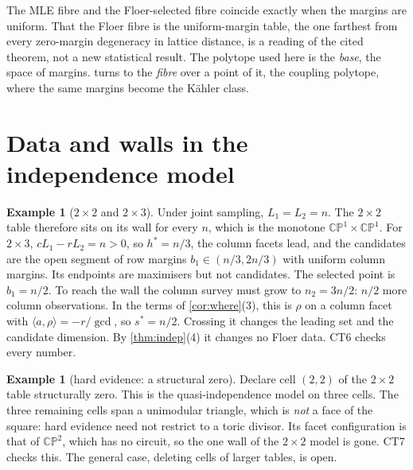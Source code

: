\documentclass[11pt]{article}
\theoremstyle{definition}\newtheorem{definition}[theorem]{Definition}\newtheorem{remark}[theorem]{Remark}\newtheorem{example}[theorem]{Example}\newtheorem{problem}[theorem]{Open problem}\crefname{problem}{Problem}{Problems}
\begin{document}
The MLE fibre and the Floer-selected fibre coincide exactly when the margins are uniform. That the Floer fibre is the uniform-margin table,
the one farthest from every zero-margin degeneracy in lattice distance, is a reading of the cited theorem, not a new statistical result.
The polytope used here is the \emph{base}, the space of margins.  turns to the \emph{fibre} over a point of it, the coupling polytope, where the
same margins become the K\"ahler class.

\section{Data and walls in the independence model}\label{sec:indepdata}
\begin{example}[$2\times2$ and $2\times3$]\label{ex:2x3}
Under joint sampling, $L_1=L_2=n$. The $2\times2$ table therefore sits on its wall for every $n$, which is the monotone $\mathbb{CP}^1\times\mathbb{CP}^1$. For $2\times3$, $cL_1-rL_2=n>0$, so $h^*=n/3$, the column
facets lead, and the candidates are the open segment of row margins $b_1\in(n/3,2n/3)$ with uniform column margins. Its endpoints are maximisers but not candidates.
The selected point is $b_1=n/2$. To reach the wall the column survey must grow to $n_2=3n/2$: $n/2$ more column observations. In the terms of \cref{cor:where}(3), this is
$\rho$ on a column facet with $\langle a,\rho\rangle=-r/\gcd$, so $s^*=n/2$. Crossing it changes the leading set and the candidate dimension. By \cref{thm:indep}(4) it changes no Floer data.
CT6 checks every number.
\end{example}

\begin{example}[hard evidence: a structural zero]\label{ex:zero}
Declare cell $(2,2)$ of the $2\times2$ table structurally zero. This is the quasi-independence model on three cells. The three remaining cells span a unimodular
triangle, which is \emph{not} a face of the square: hard evidence need not restrict to a toric divisor. Its facet configuration is that of $\mathbb{CP}^2$, which has no circuit,
so the one wall of the $2\times2$ model is gone. CT7 checks this. The general case, deleting cells of larger tables, is open.
\end{example}
\end{document}
